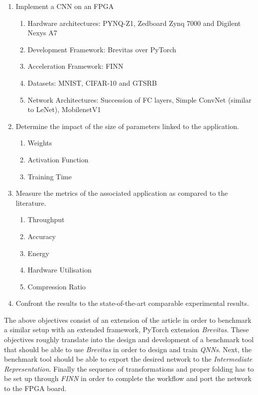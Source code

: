 \begin{enumerate}
  \item Implement a CNN on an FPGA
  \begin{enumerate}
    \item Hardware architectures: PYNQ-Z1, Zedboard Zynq 7000 and Digilent Nexys A7
    \item Development Framework: Brevitas over PyTorch
    \item Acceleration Framework: FINN
    \item Datasets: MNIST, CIFAR-10 and GTSRB
    \item Network Architectures: Succession of FC layers, Simple ConvNet (similar to LeNet), MobilenetV1
  \end{enumerate}
  \item Determine the impact of the size of parameters linked to the application.
  \begin{enumerate}
    \item Weights
    \item Activation Function
    \item Training Time
  \end{enumerate}
  \item Measure the metrics of the associated application as compared to the literature.
  \begin{enumerate}
    \item Throughput
    \item Accuracy
    \item Energy
    \item Hardware Utilisation
    \item Compression Ratio
  \end{enumerate}
  \item Confront the results to the state-of-the-art comparable experimental results.
\end{enumerate}

The above objectives consist of an extension of the \cite{Bacchus2020} article in order to benchmark a similar setup with an extended framework, PyTorch extension \emph{Brevitas}. These objectives roughly translate into the design and development of a benchmark tool that should be able to use \emph{Brevitas} in order to design and train \emph{QNNs}. Next, the benchmark tool should be able to export the desired network to the \emph{Intermediate Representation}. Finally the sequence of transformations and proper folding has to be set up through \emph{FINN} in order to complete the workflow and port the network to the FPGA board.

